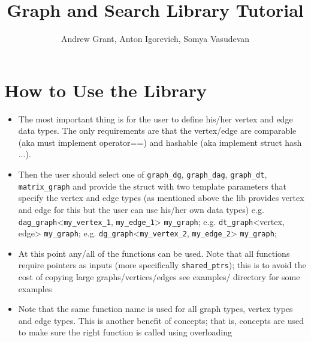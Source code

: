 \documentclass{article}
\title{Graph and Search Library Tutorial}
\author{Andrew Grant,  Anton Igorevich, Somya Vasudevan}
\date{}
\begin{document}
\maketitle

\section{How to Use the Library}
\begin{itemize}
\item The most important thing is for the user to define his/her vertex and edge data types. The only requirements are that the vertex/edge are comparable (aka must implement operator==) and hashable (aka implement struct hash ...).
\item Then the user should select one of \texttt{graph\_dg}, \texttt{graph\_dag}, \texttt{graph\_dt}, \texttt{matrix\_graph} and provide the struct with two template parameters that specify the vertex and edge types (as mentioned above the lib provides vertex and edge for this but the user can use his/her own data types) e.g. \texttt{dag\_graph}<\texttt{my\_vertex\_1}, \texttt{my\_edge\_1}> \texttt{my\_graph}; e.g. \texttt{dt\_graph}<vertex, edge> \texttt{my\_graph}; e.g. \texttt{dg\_graph}<\texttt{my\_vertex\_2}, \texttt{my\_edge\_2}> \texttt{my\_graph};
\item At this point any/all of the functions can be used. Note that all functions require pointers as inputs (more specifically \texttt{shared\_ptrs}); this is to avoid the cost of copying large graphs/vertices/edges
see examples/ directory for some examples
\item Note that the same function name is used for all graph types, vertex types and edge types. This is another benefit of concepts; that is, concepts are used to make sure the right function is called using overloading
\end{itemize}
\end{document}
